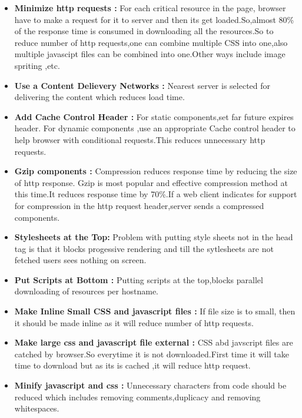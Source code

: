 \documentclass[a4paper,10pt]{IEEEtran}
\begin{document}
\begin{itemize}
\item \textbf{Minimize http requests :}
For each critical resource in the page, browser have to make a request  for it
to server and then its get loaded.So,almost 80\% of the response time is
consumed in downloading all the resources.So to reduce number of http
requests,one can combine multiple CSS into one,also multiple javascipt files can
be combined into one.Other ways include image spriting ,etc.

\item \textbf{Use a Content Delievery Networks :}
Nearest server is selected for delivering the content which reduces load time.

\item \textbf{Add Cache Control Header :}
For static components,set far future expires header.
For dynamic components ,use an appropriate Cache control header to help browser
with conditional requests.This reduces unnecessary http requests.

\item \textbf{Gzip components :}
Compression reduces response time by reducing the size of http response.
Gzip is most popular and effective compression method at this time.It reduces
response time by 70\%.If a web client indicates for support for compression in
the http request header,server sends a compressed components.

\item \textbf{Stylesheets at the Top: }
Problem with putting style sheets not in the head tag is that it blocks
progessive rendering and till the sytlesheets are not fetched users sees nothing
on screen.

\item \textbf{Put Scripts at Bottom :}
Putting scripts at the top,blocks parallel downloading of resources per
hostname.

\item \textbf{Make Inline Small CSS and javascript files :}
If file size is to small, then it should be made inline as it will reduce number
of http requests.

\item \textbf{Make large css and javascript file external :}
CSS abd javscript files are catched by browser.So everytime it is not
downloaded.First time it will take time to download but as its is cached ,it
will reduce http request.

\item \textbf{ Minify javascript and css :}
Unnecessary characters from code should be reduced which includes removing
comments,duplicacy and removing whitespaces.


\end{itemize}
\end{document}
